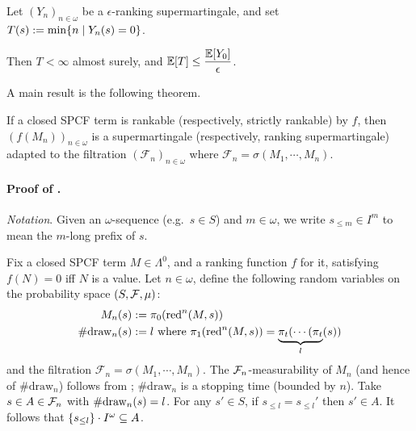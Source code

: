\begin{theorem}
\label{thm:rank-PAST}
Let $(Y_n)_{n \in \omega}$ be a $\epsilon$-ranking supermartingale, and set $T(s) := \min \{n \mid Y_n(s) = 0\}$. 

Then $T < \infty$ almost surely, and $\mathbb{E}[T] \leq \dfrac{\mathbb{E}[Y_0]}{\epsilon}$.
\end{theorem}

A main result is the following theorem.
\begin{theorem} 
\label{thm:rankable and strict rankable}
If a closed SPCF term is rankable (respectively, strictly rankable) by $f$, then $(f(M_n))_{n \in \omega}$ is a 
supermartingale (respectively, ranking supermartingale) adapted to the filtration $(\mathcal{F}_n)_{n \in \omega}$ where $\mathcal{F}_n = \sigma(M_1, \cdots, M_n)$.
\end{theorem}


\paragraph{Proof of .}
\emph{Notation}. Given an $\omega$-sequence (e.g.~$s \in S$) and $m \in \omega$, we write $s_{\leq m} \in I^m$ to mean the $m$-long prefix of $s$.

Fix a closed SPCF term $M \in \Lambda^0$, and a ranking function $f$ for it, satisfying $f(N) = 0$ iff $N$ is a value.
Let $n \in \omega$, define the following random variables on the probability space $(S, \mathcal{F}, \mu)$:
\begin{align*}
M_n(s) &:= \pi_0 (\operatorname{red}^n(M, s))\\
\#\mathrm{draw}_{n}(s) &:= l \textrm{ where $\pi_1 (\operatorname{red}^n(M, s)) = \underbrace{\pi_t( \cdots (\pi_t}_l(s))$}
\end{align*}
and the filtration $\mathcal{F}_n = \sigma(M_1, \cdots, M_n)$.
The $\mathcal{F}_n$-measurability of $M_n$ (and hence of $\#\mathrm{draw}_n$) follows from \citep{DBLP:conf/icfp/BorgstromLGS16};
$\#\mathrm{draw}_n$ is a stopping time (bounded by $n$).
Take $s \in A \in \mathcal{F}_n$ with $\#\mathrm{draw}_{n}(s) = l$.
For any $s'\in S$, if $s_{\leq l} = s_{\leq l}'$ then $s' \in A$.
It follows that ${\{s_{\leq l}\} \cdot I^\omega} \subseteq A$.

